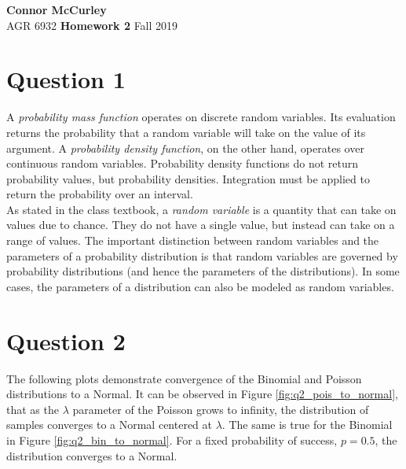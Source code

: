 \documentclass{article}[12 pt]
\begin{document}
	
\begin{center}
	\textbf{\Large Connor McCurley} \\
	AGR 6932  \qquad \quad \quad \textbf{\large Homework 2} \quad \quad \qquad Fall 2019 
\end{center}



\section*{Question 1}
A \textit{probability mass function} operates on discrete random variables.  Its evaluation returns the probability that a random variable will take on the value of its argument.  A \textit{probability  density function}, on the other hand, operates over continuous random variables.  Probability density functions do not return probability values, but probability densities. Integration must be applied to return the probability over an interval. \\

\noindent
As stated in the class textbook, a \textit{random variable} is a quantity that can take on values due to chance.  They do not have a single value, but instead can take on a range of values.  The important distinction between random variables and the parameters of a probability distribution is that random variables are governed by probability distributions (and hence the parameters of the distributions).  In some cases, the parameters of a distribution can also be modeled as random variables. 


\section*{Question 2}
The following plots demonstrate convergence of the Binomial and Poisson distributions to a Normal.  It can be observed in Figure \ref{fig:q2_pois_to_normal}, that as the $\lambda$ parameter of the Poisson grows to infinity, the distribution of samples converges to a Normal centered at $\lambda$.  The same is true for the Binomial in Figure \ref{fig:q2_bin_to_normal}.  For a fixed probability of success, $p=0.5$, the distribution converges to a Normal. 
\end{document}
